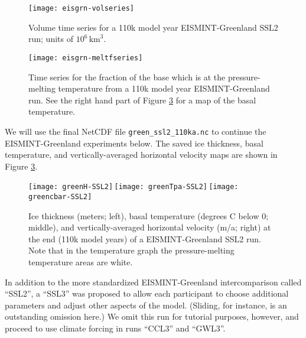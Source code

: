 \begin{figure}[ht]
\centering
\texttt{[image: eisgrn-volseries]}
\caption{Volume time series for a 110k model year EISMINT-Greenland SSL2 run; units of $10^{6}\,\text{km}^3$.}
\label{fig:eisgrnvolseries}
\end{figure}

\begin{figure}[ht]
\centering
\texttt{[image: eisgrn-meltfseries]}
\caption{Time series for the fraction of the base which is at the pressure-melting temperature from a 110k model year EISMINT-Greenland run.  See the right hand part of Figure \ref{fig:ssl2thickTpa} for a map of the basal temperature.}
\label{fig:eisgrnmeltfseries}
\end{figure}

We will use the final NetCDF file \texttt{green_ssl2_110ka.nc} to continue the EISMINT-Greenland experiments below.  The saved ice thickness, basal temperature, and vertically-averaged horizontal velocity maps are shown in Figure \ref{fig:ssl2thickTpa}.

\begin{figure}[ht]
\centering
\mbox{\phantom{|}\hspace{-1.0in}\texttt{[image: greenH-SSL2]}\,\texttt{[image: greenTpa-SSL2]}\,\texttt{[image: greencbar-SSL2]}}
\caption{Ice thickness (meters; left), basal temperature (degrees C below 0; middle), and vertically-averaged horizontal velocity (m/a; right) at the end (110k model years) of a EISMINT-Greenland SSL2 run.  Note that in the temperature graph the pressure-melting temperature areas are white.}
\label{fig:ssl2thickTpa}
\end{figure}

In addition to the more standardized EISMINT-Greenland intercomparison called ``SSL2'', a ``SSL3'' was proposed to allow each participant to choose additional parameters and adjust other aspects of the model.  (Sliding, for instance, is an outstanding omission here.)  We omit this run for tutorial purposes, however, and proceed to use climate forcing in runs ``CCL3'' and ``GWL3''.


